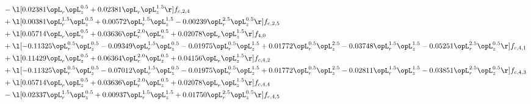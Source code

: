 \begin{alignat}{2}
& - \l[  0.02381 \opL_r \opL_z^{0.5} +  0.02381 \opL_r \opL_z^{1.5}  \r] f_{c,2,4} \nonumber \\ 
& + \l[  0.00381 \opL_r^{1.5} \opL_z^{0.5} +  0.00572 \opL_r^{1.5} \opL_z^{1.5}   -0.00239 \opL_r^{2.5} \opL_z^{0.5}  \r] f_{c,2,5} \nonumber \\ 
& + \l[  0.05714 \opL_r \opL_z^{0.5} +  0.03636 \opL_r^{2.0} \opL_z^{0.5} +  0.02078 \opL_r \opL_z^{1.5}  \r] f_{4,0} \nonumber \\ 
& + \l[  -0.11325 \opL_r^{0.5} \opL_z^{0.5}   -0.09349 \opL_r^{1.5} \opL_z^{0.5}   -0.01975 \opL_r^{0.5} \opL_z^{1.5} +  0.01772 \opL_r^{0.5} \opL_z^{2.5}   -0.03748 \opL_r^{1.5} \opL_z^{1.5}   -0.05251 \opL_r^{2.5} \opL_z^{0.5}  \r] f_{c,4,1} \nonumber \\ 
& + \l[  0.11429 \opL_r \opL_z^{0.5} +  0.06364 \opL_r^{2.0} \opL_z^{0.5} +  0.04156 \opL_r \opL_z^{1.5}  \r] f_{c,4,2} \nonumber \\ 
& + \l[  -0.11325 \opL_r^{0.5} \opL_z^{0.5}   -0.07012 \opL_r^{1.5} \opL_z^{0.5}   -0.01975 \opL_r^{0.5} \opL_z^{1.5} +  0.01772 \opL_r^{0.5} \opL_z^{2.5}   -0.02811 \opL_r^{1.5} \opL_z^{1.5}   -0.03851 \opL_r^{2.5} \opL_z^{0.5}  \r] f_{c,4,3} \nonumber \\ 
& + \l[  0.05714 \opL_r \opL_z^{0.5} +  0.03636 \opL_r^{2.0} \opL_z^{0.5} +  0.02078 \opL_r \opL_z^{1.5}  \r] f_{c,4,4} \nonumber \\ 
& - \l[  0.02337 \opL_r^{1.5} \opL_z^{0.5} +  0.00937 \opL_r^{1.5} \opL_z^{1.5} +  0.01750 \opL_r^{2.5} \opL_z^{0.5}  \r] f_{c,4,5} \nonumber \\ 
\end{alignat} 


